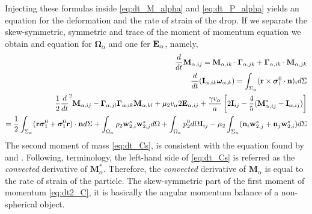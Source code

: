 Injecting these formulas inside \ref{eq:dt_M_alpha} and \ref{eq:dt_P_alpha} yields an equation for the deformation and the rate of strain of the drop. 
If we separate the skew-symmetric, symmetric and trace of the moment of momentum equation we obtain and equation for $\bm\Omega_\alpha$ and one fer  $\textbf E_\alpha$, namely,
\begin{align*}
    \frac{d}{d t} \textbf{M}_{\alpha,ij}
    = \textbf{M}_{\alpha,ik} \cdot \bm\Gamma_{\alpha,jk}
    +  \bm\Gamma_{\alpha,ik} \cdot \textbf{M}_{\alpha,jk}\\
    \frac{d}{d t} (\textbf{I}_{\alpha,ik}\bm\omega_{\alpha,k} )
    = 
    \int_{\Sigma_\alpha} (\textbf{r}\times\bm\sigma_1^0\cdot \textbf{n})_i d\Sigma \\
    \frac{1}{2}\frac{d}{d t}^2 \textbf{M}_{\alpha,ij}
    -  \bm\Gamma_{\alpha,jl}\bm\Gamma_{\alpha,ik} \textbf{M}_{\alpha,kl}  
    + \mu_2 v_\alpha 2\textbf{E}_{\alpha,ij}
    + \frac{\gamma v_\alpha }{a} \left[
    2\textbf{I}_{ij} 
    - \frac{4 }{5} (\textbf{M}_{\alpha,ij}^* - \textbf{I}_{\alpha,ij})
    \right]\\
    = 
    \frac{1}{2}\int_{\Sigma_\alpha} (\textbf{r}\bm\sigma_1^0 + \bm\sigma_1^0\textbf{r})\cdot \textbf{n} d\Sigma 
    + \int_{\Omega_\alpha} \rho_2 \textbf{w}_{2,i}^s\textbf{w}_{2,j}^s d\Omega
    + \int_{\Omega_\alpha} p_2^0 d\Omega \textbf{I}_{ij}
    - \mu_2 \int_{\Sigma_\alpha} (\textbf{n}_i \textbf{w}_{2,j}^s + \textbf{n}_j \textbf{w}_{2,i}^s) d\Sigma\\
\end{align*}
The second moment of mass \ref{eq:dt_Cs}, is consistent with the equation found by \citet{goddard1967nonlinear} and \citet{lhuillier1987phenomenology}. 
Following, \citet{goddard1967nonlinear}  terminology, the left-hand side of \ref{eq:dt_Cs} is referred as the \textit{convected} derivative of $\textbf{M}^*_\alpha$. 
Therefore, the \textit{convected} derivative of $\textbf{M}_\alpha$ is equal to the rate of strain of the particle. 
The skew-symmetric part of the first moment of momentum \ref{eq:dt2_C}, it is basically the angular momentum balance of a non-spherical object. 
